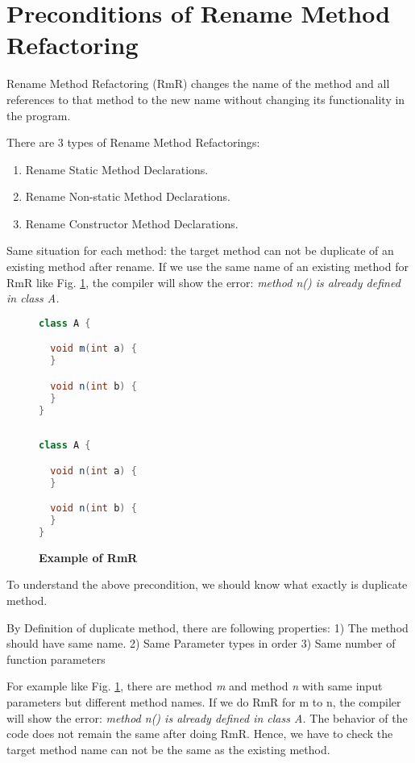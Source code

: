 \section{\textbf{Preconditions of Rename Method Refactoring}}

Rename Method Refactoring (RmR) changes the name of the method and all references to that method to the new name without changing its functionality in the program.

There are 3 types of Rename Method Refactorings:
\begin{enumerate}
\item Rename Static Method Declarations.
\item Rename Non-static Method Declarations.
\item Rename Constructor Method Declarations.
\end{enumerate}

Same situation for each method: the target method can not be duplicate of an existing method after rename. If we use the same name of an existing method for RmR like Fig. \ref{fig:RmR}, the compiler will show the error: \textsl{method n() is already defined in class A.}

\begin{figure}[th]
\centering
\begin{minipage}[t]{0.45\linewidth}
\begin{lstlisting}[language=java, basicstyle=\scriptsize\ttfamily,frame=single]
class A {

  void m(int a) {	
  }

  void n(int b) {	
  }	
}
 
\end{lstlisting}
\end{minipage}
\hfill
\begin{minipage}[t]{0.45\linewidth}
\begin{lstlisting}[language=java, basicstyle=\scriptsize\ttfamily,frame=single]
class A {

  void n(int a) {	
  }

  void n(int b) {	
  }	
}

\end{lstlisting}
\end{minipage}
\caption{\textbf{Example of RmR}}
\label{fig:RmR}
\end{figure}

To understand the above precondition, we should know what exactly is duplicate method.

By Definition of duplicate method, there are following properties:
1) The method should have same name.
2) Same Parameter types in order
3) Same number of function parameters

For example like Fig. \ref{fig:RmR}, there are method \textsl{m} and method \textsl{n} with same input parameters but different method names. If we do RmR for m to n, the compiler will show the error: \textsl{method n() is already defined in class A.} The behavior of the code does not remain the same after doing RmR. Hence, we have to check the target method name can not be the same as the existing method.